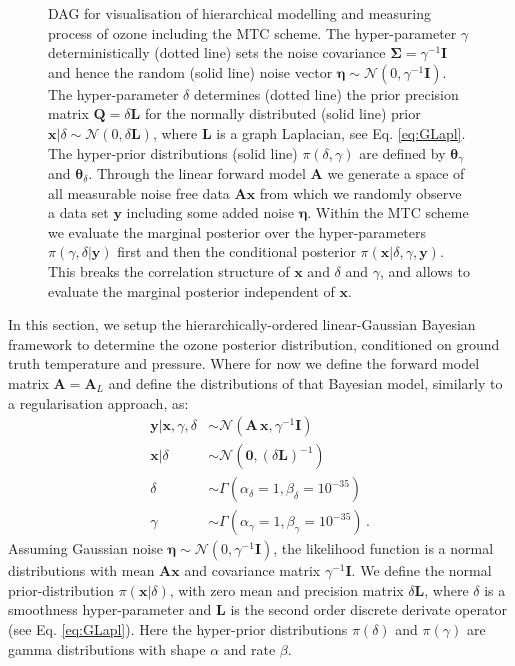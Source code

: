 \begin{figure}[htb!]
\begin{tikzpicture}
	\end{tikzpicture} 
	\caption[Directed acyclic graph for ozone retrieval and MTC scheme.]{DAG for visualisation of hierarchical modelling and measuring process of ozone including the MTC scheme. The hyper-parameter $\gamma$ deterministically (dotted line) sets the noise covariance $\bm{\Sigma} = \gamma^{-1}\bm{I}$ and hence the random (solid line) noise vector $\bm{\eta} \sim \mathcal{N}(0, \gamma^{-1}\bm{I})$.
	The hyper-parameter $\delta$ determines (dotted line) the prior precision matrix $\bm{Q} = \delta \bm{L}$ for the normally distributed (solid line) prior $\bm{x}| \delta \sim \mathcal{N}(0, \delta \bm{L})$, where $\bm{L}$ is a graph Laplacian, see Eq. \ref{eq:GLapl}.
	The hyper-prior distributions (solid line) $\pi(\delta, \gamma)$ are defined by $\bm{\theta}_{\gamma}$ and $\bm{\theta}_{\delta}$.
	Through the linear forward model $\bm{A}$ we generate a space of all measurable noise free data $\bm{A}\bm{x}$ from which we randomly observe a data set $\bm{y}$ including some added noise $\bm{\eta}$.
	Within the MTC scheme we evaluate the marginal posterior over the hyper-parameters $\pi(\gamma, \delta | \bm{y})$ first and then the conditional posterior $\pi(\bm{x}|\delta,\gamma,\bm{y})$. This breaks the correlation structure of $\bm{x}$ and $\delta$ and $\gamma$, and allows to evaluate the marginal posterior independent of $\bm{x}$.}
	\label{fig:DAGO3}
\end{figure}
In this section, we setup the hierarchically-ordered linear-Gaussian Bayesian framework to determine the ozone posterior distribution, conditioned on ground truth temperature and pressure.
Where for now we define the forward model matrix $\bm{A} = \bm{A}_L$ and define the distributions of that Bayesian model, similarly to a regularisation approach, as:
\begin{subequations}
	\begin{align}
		\bm{y} |  \bm{x},\gamma,\delta  &\sim \mathcal{N}(\bm{A} \, \bm{x}, \gamma^{-1} \bm{I}) \label{eq:likelihoodAppl} \\
		\bm{x}| \delta  &\sim \mathcal{N}(\bm{0}, (\delta \bm{L})^{-1} ) \label{eq:priorXAppl} \\
		\delta  &\sim \Gamma(\alpha_{\delta} = 1, \beta_{\delta} = 10^{-35})\label{eq:priorDelAppl} \\
		\gamma  &\sim \Gamma(\alpha_{\gamma} =1, \beta_{\gamma} = 10^{-35})\label{eq:priorGamAppl} \, .
	\end{align} 
	\label{eq:O3BayMode}
\end{subequations}
Assuming Gaussian noise $\bm{\eta} \sim \mathcal{N}(0, \gamma^{-1} \bm{I})$, the likelihood function is a normal distributions with mean $\bm{A} \bm{x}$ and covariance matrix $\gamma^{-1} \bm{I}$.
We define the normal prior-distribution $\pi(\bm{x}|\delta)$, with zero mean and precision matrix $\delta \bm{L}$, where $\delta$ is a smoothness hyper-parameter and $\bm{L}$ is the second order discrete derivate operator (see Eq. \ref{eq:GLapl}).
Here the hyper-prior distributions $\pi(\delta)$ and $\pi(\gamma)$ are gamma distributions with shape $\alpha$ and rate $\beta$.

